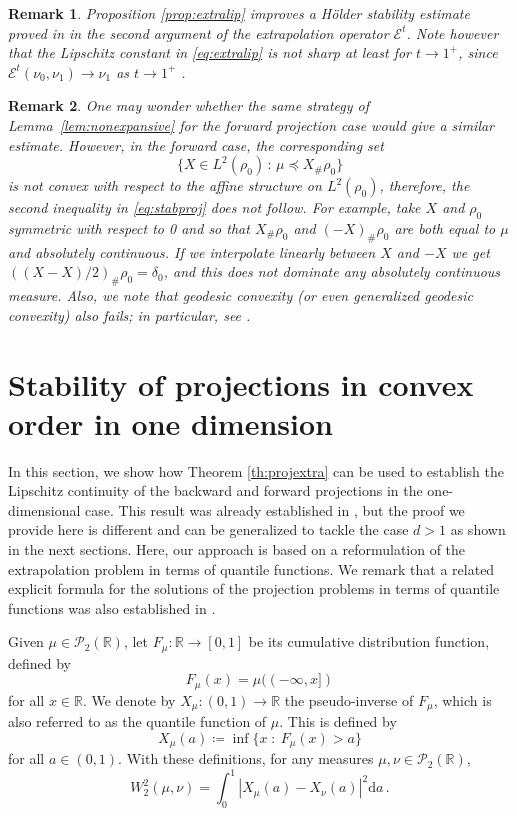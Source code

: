 \documentclass[12pt]{amsart}
\def\ed{\mathrm{d}}
\newtheorem{remark}{Remark}
\begin{document}
\begin{remark}\label{rem:improve} Proposition \ref{prop:extralip} improves a H\"older stability estimate proved in \cite[Lemma 2.3]{Gallouet2025} in the second argument of the extrapolation operator $\mathscr{E}^t$. Note however that the Lipschitz constant in \eqref{eq:extralip} is  not sharp at least for $t\rightarrow 1^+$, since $\mathscr{E}^t(\nu_0,\nu_1) \rightarrow \nu_1$ as $t\rightarrow 1^+$ \cite{Gallouet2025}. 
\end{remark}

\begin{remark}
One may wonder whether the same strategy of Lemma~\ref{lem:nonexpansive} for the forward projection case would give a similar estimate. 
However, in  the forward case, the corresponding set 
\[
\{ X\in L^2(\rho_0) \,:\, \mu \preceq X_\# \rho_0\}
\]
is not convex with respect to the affine structure on $L^2(\rho_0)$, therefore, the second inequality in \eqref{eq:stabproj} does not follow. 
For example, take $X$ and $\rho_0$ symmetric with respect to 0 and so that $X_\#\rho_0$ and $(-X)_\# \rho_0$ are both equal to $\mu$ and absolutely continuous. If we interpolate linearly between $X$ and $-X$ we get $((X-X)/2)_\# \rho_0 = \delta_0$, and this does not dominate any absolutely continuous measure. Also, we note that  geodesic convexity (or even generalized geodesic convexity) also fails; in particular, see \cite[Section 8.2]{kim2024backward}.
\end{remark}

\section{Stability of  projections in convex order in one dimension}

In this section, we show how Theorem \ref{th:projextra} can be used to establish the Lipschitz continuity of the backward and forward projections in the one-dimensional case. This result was already established in  \cite{jourdain2023lipschitz}, but the proof we provide here is different and can be generalized to tackle the case $d>1$ as shown in the next sections.  Here, our approach is based on a reformulation of the extrapolation problem in terms of quantile functions. We remark that a related explicit formula for the solutions of the projection problems in terms of quantile functions was also established in \cite{alfonsi2020sampling}.





Given $\mu \in \mathcal{P}_2(\mathbb{R})$, let $F_\mu: \mathbb{R}\rightarrow [0,1]$ be its cumulative distribution function, defined by
\[
F_\mu(x) = \mu((-\infty,x])
\]
for all $x\in \mathbb{R}$. We denote by $X_\mu:(0,1) \rightarrow \mathbb{R}$ the pseudo-inverse of $F_\mu$,  which is also referred to as the quantile function of $\mu$. This is defined by \[X_\mu(a) \coloneqq \inf \{ x \;:\: F_\mu(x)>a\}\] for all $a\in(0,1)$. With these definitions, for any measures
$\mu, \nu \in \mathcal{P}_2(\mathbb{R})$,
\begin{equation}\label{eq:w2oned}
W_2^2(\mu,\nu) = \int_0^1 |X_\mu(a)-X_\nu(a)|^2\ed a\,.
\end{equation}
\end{document}
